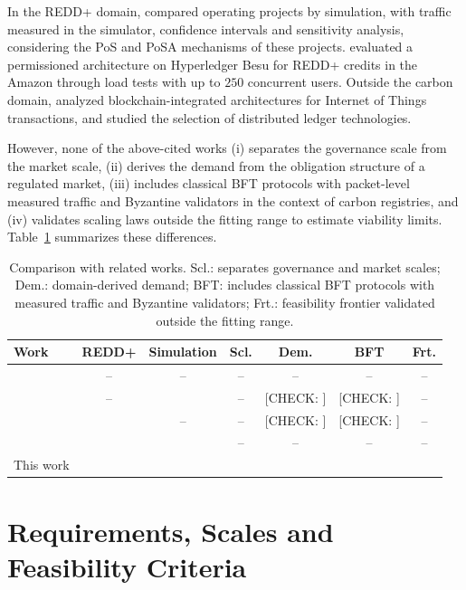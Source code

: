\documentclass[english]{sbc2025}%
\newcommand{\chk}[1]{\textcolor{orange!80!black}{[CHECK: #1]}}
\newcommand{\cmark}{\ding{51}}
\begin{document}
In the REDD+ domain, \citet{Caburlao2025reic,Caburlao2026clei} compared operating projects by simulation, with traffic measured in the simulator, confidence intervals and sensitivity analysis, considering the PoS and PoSA mechanisms of these projects. \citet{Bastos2026} evaluated a permissioned architecture on Hyperledger Besu for REDD+ credits in the Amazon through load tests with up to $250$ concurrent users. Outside the carbon domain, \citet{Rodrigues2021} analyzed blockchain-integrated architectures for Internet of Things transactions, and \citet{Rodrigues2024} studied the selection of distributed ledger technologies.

However, none of the above-cited works (i) separates the governance scale from the market scale, (ii) derives the demand from the obligation structure of a regulated market, (iii) includes classical BFT protocols with packet-level measured traffic and Byzantine validators in the context of carbon registries, and (iv) validates scaling laws outside the fitting range to estimate viability limits. Table~\ref{tab:related} summarizes these differences.

\begin{table}[!ht]
\caption{Comparison with related works. Scl.: separates governance and market scales; Dem.: domain-derived demand; BFT: includes classical BFT protocols with measured traffic and Byzantine validators; Frt.: feasibility frontier validated outside the fitting range.}
\label{tab:related}
\centering
\small
\begin{tabular}{@{}lcccccc@{}}
\hline\hline
Work & REDD+ & Simulation & Scl. & Dem. & BFT & Frt. \\
\hline
\citet{Bamakan2020}      & --     & --     & --     & --     & --     & -- \\
\citet{Zeydan2026}       & --     & \cmark & --     & \chk{} & \chk{} & -- \\
\citet{Bastos2026}       & \cmark & --     & --     & \chk{} & \chk{} & -- \\
\citet{Caburlao2026clei} & \cmark & \cmark & --     & --     & --     & -- \\
This work                & \cmark & \cmark & \cmark & \cmark & \cmark & \cmark \\
\hline\hline
\end{tabular}
\end{table}

\section{Requirements, Scales and Feasibility Criteria}
\label{sec:model}
\end{document}
